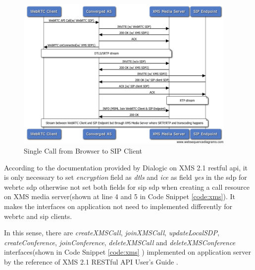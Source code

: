 \begin{figure}
	\centering
    	\includegraphics[width=0.95\textwidth,natwidth=610,natheight=642]{figs/chrome2xms.png}
  	\caption{Single Call from Browser to SIP Client}
  	\label{fig:chrome2xms}
\end{figure}

\par According to the documentation provided by Dialogic on XMS 2.1 \gls{rest}ful \gls{api}\cite{doc:xms_webapi}, it is only necessary to set \textit{encryption} field as \textit{dtls} and \textit{ice} as field \textit{yes} in the \gls{sdp} for \gls{webrtc} \gls{sdp} otherwise not set both fields for \gls{sip} \gls{sdp} when creating a call resource on XMS media server(shown at line 4 and 5 in Code Snippet \ref{code:xms}). It makes the interfaces on application not need to implemented differently for \gls{webrtc} and \gls{sip} clients.

\par In this sense, there are \textit{createXMSCall}, \textit{joinXMSCall}, \textit{updateLocalSDP}, \textit{createConference}, \textit{joinConference}, \textit{deleteXMSCall} and \textit{deleteXMSConference} interfaces(shown in Code Snippet \ref{code:xms} ) implemented on application server by the reference of XMS 2.1 RESTful API User's Guide \cite{doc:xms_webapi}.


